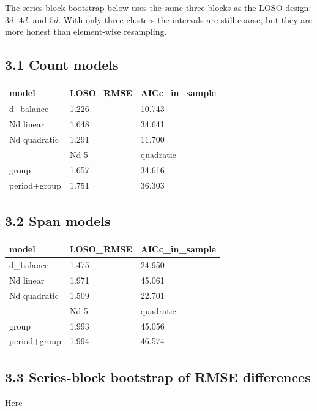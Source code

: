 The series-block bootstrap below uses the same three blocks as the LOSO
design: \(3d\), \(4d\), and \(5d\). With only three clusters the
intervals are still coarse, but they are more honest than element-wise
resampling.

\subsection{3.1 Count models}\label{count-models}

\begin{longtable}[]{@{}lll@{}}
\toprule\noalign{}
model & LOSO\_RMSE & AICc\_in\_sample \\
\midrule\noalign{}
\endhead
\bottomrule\noalign{}
\endlastfoot
d\_balance & 1.226 & 10.743 \\
Nd linear & 1.648 & 34.641 \\
Nd quadratic & 1.291 & 11.700 \\
& Nd-5 & quadratic \\
group & 1.657 & 34.616 \\
period+group & 1.751 & 36.303 \\
\end{longtable}

\subsection{3.2 Span models}\label{span-models}

\begin{longtable}[]{@{}lll@{}}
\toprule\noalign{}
model & LOSO\_RMSE & AICc\_in\_sample \\
\midrule\noalign{}
\endhead
\bottomrule\noalign{}
\endlastfoot
d\_balance & 1.475 & 24.950 \\
Nd linear & 1.971 & 45.061 \\
Nd quadratic & 1.509 & 22.701 \\
& Nd-5 & quadratic \\
group & 1.993 & 45.056 \\
period+group & 1.994 & 46.574 \\
\end{longtable}

\subsection{3.3 Series-block bootstrap of RMSE
differences}\label{series-block-bootstrap-of-rmse-differences}

Here

